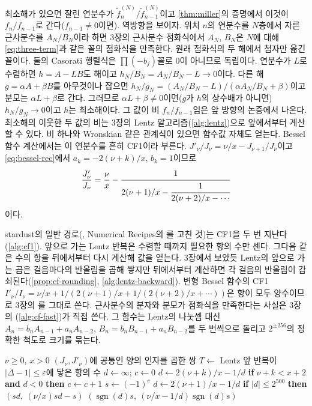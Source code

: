 최소해가 있으면 잘린 연분수가 $\tilde f^{(N)}_n/\tilde f^{(N)}_{n-1}$이고 \cref{thm:miller}의 증명에서 이것이 $f_n/f_{n-1}$로 간다($f_{n-1}\ne0$이면). 역방향을 보이자. 위치 $n$의 연분수를 $N$층에서 자른 근사분수를 $A_N/B_N$이라 하면 3장의 근사분수 점화식에서 $A_N$, $B_N$은 $N$에 대해 \cref{eq:three-term}과 같은 꼴의 점화식을 만족한다. 원래 점화식의 두 해에서 첨자만 옮긴 꼴이다. 둘의 Casorati 행렬식은 $\prod(-b_j)$꼴로 $0$이 아니므로 독립이다. 연분수가 $L$로 수렴하면 $h=A-LB$도 해이고 $h_N/B_N=A_N/B_N-L\to0$이다. 다른 해 $g=\alpha A+\beta B$를 아무것이나 잡으면 $h_N/g_N=(A_N/B_N-L)/(\alpha A_N/B_N+\beta)$이고 분모는 $\alpha L+\beta$로 간다. 그러므로 $\alpha L+\beta\ne0$이면($g$가 $h$의 상수배가 아니면) $h_N/g_N\to0$이고 $h$는 최소해이다. 그 값이 비 $f_n/f_{n-1}$임은 앞 방향의 논증에서 나온다\cite{gautschi1967recurrence}. 최소해의 이웃한 두 값의 비는 3장의 Lentz 알고리즘(\cref{alg:lentz})으로 앞에서부터 계산할 수 있다. 비 하나와 Wronskian 같은 관계식이 있으면 함수값 자체도 얻는다. Bessel 함수 계산에서는 이 연분수를 흔히 CF1이라 부른다. $J'_\nu/J_\nu=\nu/x-J_{\nu+1}/J_\nu$이고 \cref{eq:bessel-rec}에서 $a_k=-2(\nu+k)/x$, $b_k=1$이므로
\[
\frac{J'_\nu}{J_\nu}=\frac\nu x-\cfrac{1}{2(\nu+1)/x-\cfrac{1}{2(\nu+2)/x-\cdots}}
\]
이다.

stardust의 일반 경로(, Numerical Recipes의 \cite{press2007nr}를 고친 것)는 CF1을 두 번 지난다(\cref{alg:cf1}). 앞으로 가는 Lentz 반복은 수렴할 때까지 필요한 항의 수만 센다. 그다음 같은 수의 항을 뒤에서부터 다시 계산해 값을 얻는다. 3장에서 보았듯 Lentz의 앞으로 가는 곱은 걸음마다의 반올림을 곱해 쌓지만 뒤에서부터 계산하면 각 걸음의 반올림이 감쇠된다(\cref{prop:cf-rounding}, \cref{alg:lentz-backward}). 변형 Bessel 함수의 CF1 $I'_\nu/I_\nu=\nu/x+1/(2(\nu+1)/x+1/(2(\nu+2)/x+\cdots))$은 항이 모두 양수이므로 3장의 를 그대로 쓴다. 근사분수의 분자와 분모가 점화식을 만족한다는 사실은 3장의 (\cref{alg:cf-fast})가 직접 쓴다. 그 함수는 Lentz의 나눗셈 대신 $A_n=b_nA_{n-1}+a_nA_{n-2}$, $B_n=b_nB_{n-1}+a_nB_{n-2}$를  두 번씩으로 돌리고 $2^{\pm256}$의 정확한 척도로 크기를 묶는다.

\begin{algorithm}[htbp]
\begin{algorithmic}[1]
\Require $\nu\ge0$, $x>0$
\Ensure $(J_\nu,J'_\nu)$에 공통인 양의 인자를 곱한 쌍
\State $T\gets$ Lentz 앞 반복이 $|\Delta-1|\le\varepsilon$에 닿은 항의 수 
\State $d\gets\infty$; $c\gets0$
  \State $d\gets2(\nu+k)/x-1/d$ 
  \State \textbf{if} $\nu+k<x+2$ \textbf{and} $d<0$ \textbf{then} $c\gets c+1$ 
\EndFor
\State $s\gets(-1)^c$ 
\State $d\gets2(\nu+1)/x-1/d$ 
\State \textbf{if} $|d|\le2^{500}$ \textbf{then} \Return $(sd,\ (\nu/x)sd-s)$ 
\State \Return $(\operatorname{sgn}(d)s,\ (\nu/x-1/d)\operatorname{sgn}(d)s)$ 
\end{algorithmic}
\caption{CF1의 뒤 패스와 부호 세기 (stardust 의 )}
\label{alg:cf1}
\end{algorithm}

